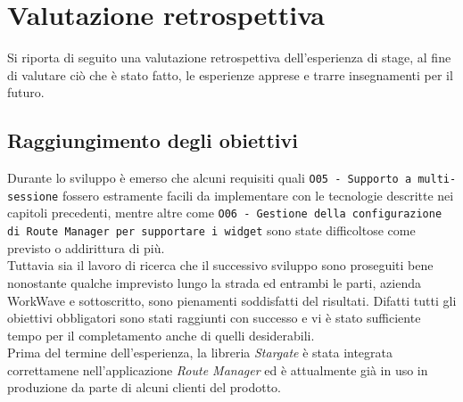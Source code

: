 
\chapter{Valutazione retrospettiva}
\label{cap:valutazione}

Si riporta di seguito una valutazione retrospettiva dell'esperienza di stage, al fine di valutare ciò che è stato fatto, le esperienze apprese e trarre insegnamenti per il futuro.

\section{Raggiungimento degli obiettivi}

Durante lo sviluppo è emerso che alcuni requisiti quali \texttt{O05 - Supporto a multi-sessione} fossero estramente facili da implementare con le tecnologie descritte nei capitoli precedenti, mentre altre come \texttt{O06 - Gestione della configurazione di Route Manager per supportare i widget} sono state difficoltose come previsto o addirittura di più. \\

Tuttavia sia il lavoro di ricerca che il successivo sviluppo sono proseguiti bene nonostante qualche imprevisto lungo la strada ed entrambi le parti, azienda WorkWave e sottoscritto, sono pienamenti soddisfatti del risultati. Difatti tutti gli obiettivi obbligatori sono stati raggiunti con successo e vi è stato sufficiente tempo per il completamento anche di quelli desiderabili. \\

Prima del termine dell'esperienza, la libreria \textit{Stargate} è stata integrata correttamene nell'applicazione \textit{Route Manager} ed è attualmente già in uso in produzione da parte di alcuni clienti del prodotto. \\

